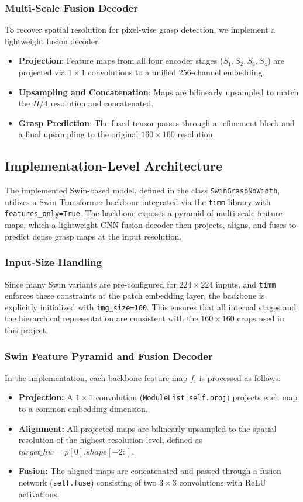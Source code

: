\subsubsection{Multi-Scale Fusion Decoder}
To recover spatial resolution for pixel-wise grasp detection, we implement a lightweight fusion decoder:
\begin{itemize}
    \item \textbf{Projection}: Feature maps from all four encoder stages ($S_1, S_2, S_3, S_4$) are projected via $1 \times 1$ convolutions to a unified 256-channel embedding.
    \item \textbf{Upsampling and Concatenation}: Maps are bilinearly upsampled to match the $H/4$ resolution and concatenated.
    \item \textbf{Grasp Prediction}: The fused tensor passes through a refinement block and a final upsampling to the original $160 \times 160$ resolution.
\end{itemize}

\clearpage
\subsection{Implementation-Level Architecture}

The implemented Swin-based model, defined in the class \texttt{SwinGraspNoWidth}, utilizes a Swin Transformer backbone integrated via the \texttt{timm} library with \texttt{features\_only=True}. The backbone exposes a pyramid of multi-scale feature maps, which a lightweight CNN fusion decoder then projects, aligns, and fuses to predict dense grasp maps at the input resolution.

\subsubsection{Input-Size Handling}
Since many Swin variants are pre-configured for $224 \times 224$ inputs, and \texttt{timm} enforces these constraints at the patch embedding layer, the backbone is explicitly initialized with \texttt{img\_size=160}. This ensures that all internal stages and the hierarchical representation are consistent with the $160 \times 160$ crops used in this project.

\subsubsection{Swin Feature Pyramid and Fusion Decoder}
In the implementation, each backbone feature map $f_i$ is processed as follows:
\begin{itemize}
    \item \textbf{Projection:} A $1 \times 1$ convolution (\texttt{ModuleList self.proj}) projects each map to a common embedding dimension.
    \item \textbf{Alignment:} All projected maps are bilinearly upsampled to the spatial resolution of the highest-resolution level, defined as $target\_hw = p[0].shape[-2:]$.
    \item \textbf{Fusion:} The aligned maps are concatenated and passed through a fusion network (\texttt{self.fuse}) consisting of two $3 \times 3$ convolutions with ReLU activations.
\end{itemize}

